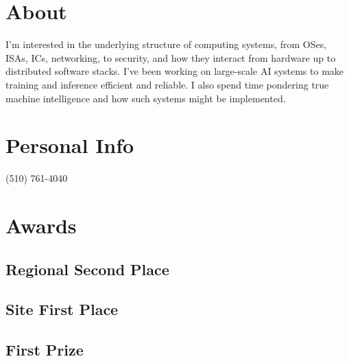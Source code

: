 \documentclass[]{deedy-resume-openfont}
\begin{document}

\begin{minipage}[t]{0.30\textwidth}

\section{About}

I'm interested in the underlying structure of computing systems, from OSes, ISAs, ICs, networking, to security, and how they interact from hardware up to distributed software stacks. I've been working on large-scale AI systems to make training and inference efficient and reliable. I also spend time pondering true machine intelligence and how such systems might be implemented.
\sectionsep

\section{Personal Info}

(510) 761-4040
\sectionsep

\href{mailto:xyyqzy@gmail.com}{}
\sectionsep

\href{https://github.com/yvbbrjdr}{}
\href{https://github.com/GreaterFire}{}
\sectionsep

\href{https://yvb.moe/in}{}
\sectionsep

\section{Awards}

\subsection{Regional Second Place}
\sectionsep

\subsection{Site First Place}
\sectionsep

\subsection{First Prize}
\sectionsep


\end{minipage}
\end{document}
